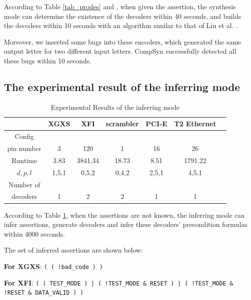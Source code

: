\documentclass[runningheads,a4paper,orivec]{llncs}
\begin{document}
According to Table \ref{tab_prodes} and ,
when given the assertion,
the synthesis mode can determine the existence of the decoders within 40 seconds,
and builds the decoders within 10 seconds with an algorithm similar to that of Liu et al. .

Moreover,
we inserted some bugs into these encoders,
which generated the same output letter for two different input letters.
CompSyn successfully detected all these bugs within 10 seconds.

\subsection{The experimental result of the inferring mode}
\begin{table}[b]
\centering
\caption{Experimental Results of the inferring mode}
\begin{tabular}{|c|c|c|c|c|c|c|}
\hline
                                        &XGXS     &XFI       &scrambler     &PCI-E    &T2 Ethernet\\\hline\hline
Config                 &&&&&\\
pin number                              &3        &120       &1             &16      &26\\\hline
Runtime                                 &3.83     &3841.34   &18.73         &8.51    &1791.22      \\\hline
$d,p,l$                                 &1,5,1    &0,5,2     &0,4,2         &2,5,1   &4,5,1          \\ \hline
Number of                               &&&&&          \\
decoders                                &1        &2         &2             &1       &1          \\ \hline
\end{tabular}\label{tab_res}
\end{table}

According to Table 	\ref{tab_res},
when the assertions are not known,
the inferring mode can infer assertions, generate decoders and infer these decoders' precondition formulas within 4000 seconds.

The set of inferred assertions are shown below:

\textbf{For XGXS}:
\texttt{( ( !bad\_code ) )}

\textbf{For XFI}:
\texttt{( ( TEST\_MODE ) | ( !TEST\_MODE \& RESET ) | ( !TEST\_MODE \& !RESET \& DATA\_VALID ) )}
\end{document}
